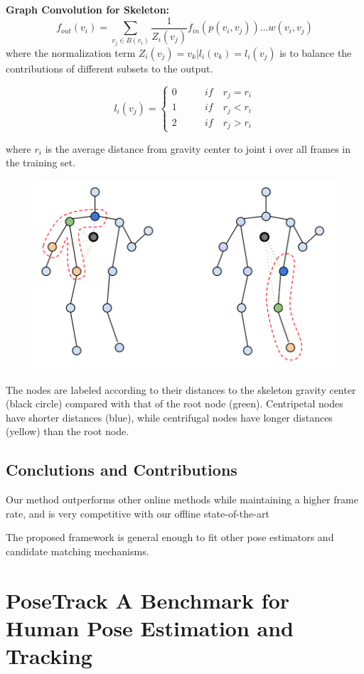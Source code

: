 \documentclass[11pt]{article}
\begin{document}
\textbf{Graph Convolution for Skeleton:}
$$f_{out}(v_i) = \sum_{v_j\in B(v_i)}\frac{1}{Z_i(v_j)}f_{in}(p(v_i,v_j))\dots w(v_i,v_j)$$
where the normalization term $Z_i(v_j) = {v_k|l_i(v_k) = l_i(v_j)}$ is to balance the contributions of different subsets to the output.

$$l_i(v_j) = \left\{\begin{matrix}
	0& \qquad if\quad r_j=r_i\\ 
	1& \qquad if\quad r_j<r_i\\
	2& \qquad if\quad r_j>r_i 
\end{matrix}\right.$$

where $r_i$ is the average distance from gravity center to joint i over all frames in the training set.
\begin{figure}[H]
	\centering
	\includegraphics[scale = 0.6]{28}
\end{figure}
The nodes are labeled according to their distances to the skeleton gravity center (black circle) compared with that of the root node (green). Centripetal nodes have shorter distances (blue), while centrifugal nodes have longer distances (yellow) than the root node.



\subsection{Conclutions and Contributions}

Our method outperforms other online methods while maintaining a higher frame rate, and is very competitive with our offline state-of-the-art

The proposed framework is general enough to fit other pose estimators and candidate matching mechanisms.

\section{PoseTrack A Benchmark for Human Pose Estimation and Tracking}
\end{document}
